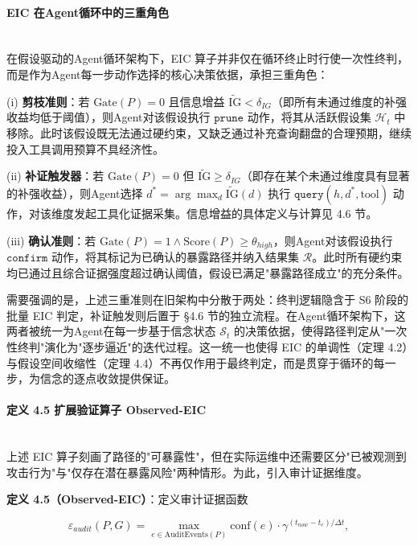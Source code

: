 \documentclass[a4paper,12pt]{ctexart}
\begin{document}
\paragraph{EIC 在Agent循环中的三重角色}\mbox{}\\

在假设驱动的Agent循环架构下，EIC 算子并非仅在循环终止时行使一次性终判，而是作为Agent每一步动作选择的核心决策依据，承担三重角色：

(i) \textbf{剪枝准则}：若 $\text{Gate}(P)=0$ 且信息增益 $\widetilde{\text{IG}} < \delta_{IG}$（即所有未通过维度的补强收益均低于阈值），则Agent对该假设执行 $\texttt{prune}$ 动作，将其从活跃假设集 $\mathcal{H}_t$ 中移除。此时该假设既无法通过硬约束，又缺乏通过补充查询翻盘的合理预期，继续投入工具调用预算不具经济性。

(ii) \textbf{补证触发器}：若 $\text{Gate}(P)=0$ 但 $\widetilde{\text{IG}} \geq \delta_{IG}$（即存在某个未通过维度具有显著的补强收益），则Agent选择 $d^* = \arg\max_d \widetilde{\text{IG}}(d)$ 执行 $\texttt{query}(h, d^*, \text{tool})$ 动作，对该维度发起工具化证据采集。信息增益的具体定义与计算见 4.6 节。

(iii) \textbf{确认准则}：若 $\text{Gate}(P)=1 \wedge \text{Score}(P) \geq \theta_{high}$，则Agent对该假设执行 $\texttt{confirm}$ 动作，将其标记为已确认的暴露路径并纳入结果集 $\mathcal{R}$。此时所有硬约束均已通过且综合证据强度超过确认阈值，假设已满足"暴露路径成立"的充分条件。

需要强调的是，上述三重准则在旧架构中分散于两处：终判逻辑隐含于 S6 阶段的批量 EIC 判定，补证触发则后置于 §4.6 节的独立流程。在Agent循环架构下，这两者被统一为Agent在每一步基于信念状态 $\mathcal{S}_t$ 的决策依据，使得路径判定从"一次性终判"演化为"逐步逼近"的迭代过程。这一统一也使得 EIC 的单调性（定理 4.2）与假设空间收缩性（定理 4.4）不再仅作用于最终判定，而是贯穿于循环的每一步，为信念的逐点收敛提供保证。

\paragraph{定义 4.5 扩展验证算子 Observed-EIC}\mbox{}\\

上述 EIC 算子刻画了路径的"可暴露性"，但在实际运维中还需要区分"已被观测到攻击行为"与"仅存在潜在暴露风险"两种情形。为此，引入审计证据维度。

\textbf{定义 4.5（Observed-EIC）}：定义审计证据函数

\[
\varepsilon_{audit}(P, G) = \max_{e \in \text{AuditEvents}(P)} \text{conf}(e) \cdot \gamma^{(t_{now} - t_e)/\Delta t},
\]
\end{document}
